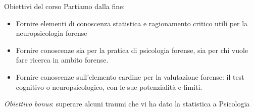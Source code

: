 \documentclass[
  ignorenonframetext,
]{beamer}
\providecommand{\tightlist}{%
  \setlength{\itemsep}{0pt}\setlength{\parskip}{0pt}}
\begin{document}
\begin{frame}{Obiettivi del corso}
\label{obiettivi-del-corso}
Partiamo dalla fine:

\begin{itemize}
\tightlist
\item
  Fornire elementi di conoscenza statistica e ragionamento critico utili
  per la neuropsicologia forense
\item
  Fornire conoscenze sia per la pratica di psicologia forense, sia per
  chi vuole fare ricerca in ambito forense.
\item
  Fornire conoscenze sull'elemento cardine per la valutazione forense:
  il test cognitivo o neuropsicologico, con le sue potenzialità e
  limiti.
\end{itemize}

\emph{Obiettivo bonus}: superare alcuni traumi che vi ha dato la
statistica a Psicologia
\end{frame}
\end{document}
